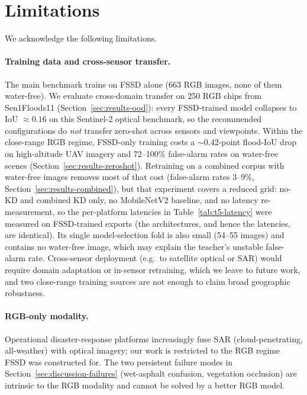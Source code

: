 
\section{Limitations}
\label{sec:limitations}

We acknowledge the following limitations.

\paragraph{Training data and cross-sensor transfer.} The main benchmark trains on FSSD alone (663 RGB images, none of them water-free). We evaluate cross-domain transfer on 250 RGB chips from Sen1Floods11 (Section~\ref{sec:results-ood}): every FSSD-trained model collapses to IoU $\approx 0.16$ on this Sentinel-2 optical benchmark, so the recommended configurations do \emph{not} transfer zero-shot across sensors and viewpoints. Within the close-range RGB regime, FSSD-only training costs a $\sim$0.42-point flood-IoU drop on high-altitude UAV imagery and 72--100\% false-alarm rates on water-free scenes (Section~\ref{sec:results-zeroshot}). Retraining on a combined corpus with water-free images removes most of that cost (false-alarm rates 3--9\%, Section~\ref{sec:results-combined}), but that experiment covers a reduced grid: no-KD and combined KD only, no MobileNetV2 baseline, and no latency re-measurement, so the per-platform latencies in Table~\ref{tab:t5-latency} were measured on FSSD-trained exports (the architectures, and hence the latencies, are identical). Its single model-selection fold is also small (54--55 images) and contains no water-free image, which may explain the teacher's unstable false-alarm rate. Cross-sensor deployment (e.g.\ to satellite optical or SAR) would require domain adaptation or in-sensor retraining, which we leave to future work, and two close-range training sources are not enough to claim broad geographic robustness.

\paragraph{RGB-only modality.} Operational disaster-response platforms increasingly fuse SAR (cloud-penetrating, all-weather) with optical imagery; our work is restricted to the RGB regime FSSD was constructed for. The two persistent failure modes in Section~\ref{sec:discussion-failures} (wet-asphalt confusion, vegetation occlusion) are intrinsic to the RGB modality and cannot be solved by a better RGB model.

